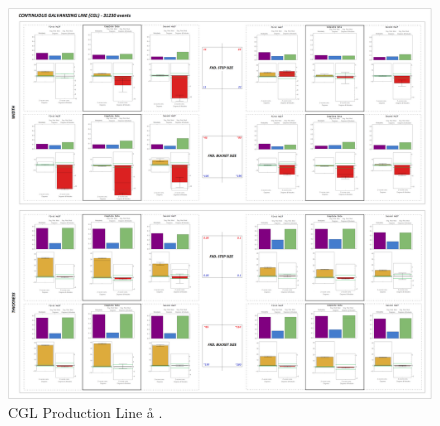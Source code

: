 \begin{landscape}
	\begin{figure}[ht]
		\centering
		\includegraphics[width=1.1\textwidth]{../images/supplements-CGL_real_life_events_analysis-results.png}
		\caption{CGL Production Line \aa{} \bb{}.}
		\label{figure-supplements-CGL}
	\end{figure}
\end{landscape}